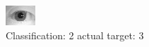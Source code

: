 \begin{figure}[h!]
\begin{center}
\includegraphics[width=0.60\columnwidth]{figures/ID1109_class_2_target_3.png}
\end{center}
\caption{ Classification: 2 actual target: 3}
\label{fig:ID1109_class_2_target_3}
\end{figure}
